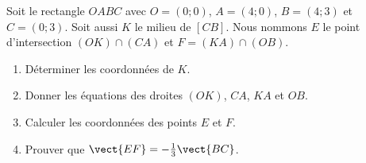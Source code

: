 
\begin{exercice}\label{exosmath-0156}

    Soit le rectangle \( OABC\) avec \( O=(0;0)\), \( A=(4;0)\), \( B=(4;3)\) et \( C=(0;3)\). Soit aussi \( K\) le milieu de \( [CB]\). Nous nommons \( E\) le point d'intersection \( (OK)\cap (CA)\) et \( F=(KA)\cap(OB)\).
    \begin{enumerate}
        \item
            Déterminer les coordonnées de \( K\).
        \item
            Donner les équations des droites \( (OK)\), \( CA\), \( KA\) et \( OB\).
        \item
            Calculer les coordonnées des points \( E\) et \( F\).
        \item
            Prouver que \( \vect{ EF }=-\frac{1}{ 3 }\vect{ BC }\).
    \end{enumerate}

\end{exercice}
